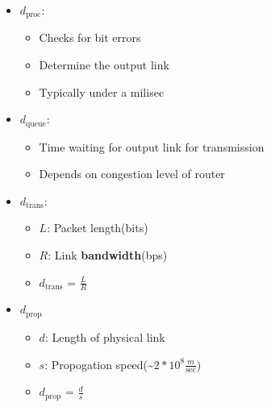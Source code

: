 \documentclass[12pt] {report}
\begin{document}
                   \begin{itemize}
                   \item $d_{\text{proc}}$:
                   \begin{itemize}

                   \item Checks for bit errors
                   \item Determine the output link
                   \item Typically under a milisec
                   \end{itemize}
                   \item $d_{\text{queue}}$:
                   \begin{itemize}

                   \item Time waiting for output link for transmission
                           \item Depends on congestion level of router
                           \end{itemize}
                   \item $d_{\text{trans}}$:
                           \begin{itemize}
                   \item $L$:
                           Packet length(bits)
                   \item $R$:
                               Link \textbf{bandwidth}(bps)
            \item \textbf{$d_{\text{trans}}$} = $\frac{L} {R}$
\end{itemize}
\item $d_{\text{prop}}$
\begin{itemize}
\item $d$:
Length of physical link
\item $s$:
Propogation speed(\~$2 * 10 ^ {8}\frac{m} {\text{sec}}$)
\item \textbf{$d_{\text{prop}}$} = $\frac{d} {s}$
\end{itemize}
\end{itemize}
\end{document}

